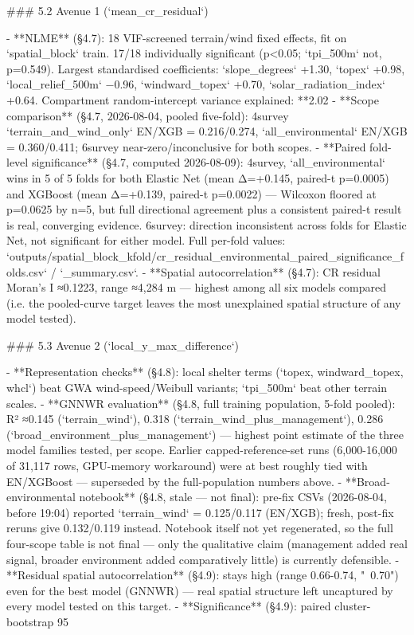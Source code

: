 ### 5.2 Avenue 1 (`mean_cr_residual`)

- **NLME** (§4.7): 18 VIF-screened terrain/wind fixed effects, fit on `spatial_block` train. 17/18 individually significant (p<0.05; `tpi_500m` not, p=0.549). Largest standardised coefficients: `slope_degrees` +1.30, `topex` +0.98, `local_relief_500m` −0.96, `windward_topex` +0.70, `solar_radiation_index` +0.64. Compartment random-intercept variance explained: **2.02%
- **Scope comparison** (§4.7, 2026-08-04, pooled five-fold): 4survey `terrain_and_wind_only` EN/XGB = 0.216/0.274, `all_environmental` EN/XGB = 0.360/0.411; 6survey near-zero/inconclusive for both scopes.
- **Paired fold-level significance** (§4.7, computed 2026-08-09): 4survey, `all_environmental` wins in 5 of 5 folds for both Elastic Net (mean Δ=+0.145, paired-t p=0.0005) and XGBoost (mean Δ=+0.139, paired-t p=0.0022) — Wilcoxon floored at p=0.0625 by n=5, but full directional agreement plus a consistent paired-t result is real, converging evidence. 6survey: direction inconsistent across folds for Elastic Net, not significant for either model. Full per-fold values: `outputs/spatial_block_kfold/cr_residual_environmental_paired_significance_folds.csv` / `_summary.csv`.
- **Spatial autocorrelation** (§4.7): CR residual Moran's I ≈0.1223, range ≈4,284 m — highest among all six models compared (i.e. the pooled-curve target leaves the most unexplained spatial structure of any model tested).

### 5.3 Avenue 2 (`local_y_max_difference`)

- **Representation checks** (§4.8): local shelter terms (`topex, windward_topex, whcl`) beat GWA wind-speed/Weibull variants; `tpi_500m` beat other terrain scales.
- **GNNWR evaluation** (§4.8, full training population, 5-fold pooled): R² ≈0.145 (`terrain_wind`), 0.318 (`terrain_wind_plus_management`), 0.286 (`broad_environment_plus_management`) — highest point estimate of the three model families tested, per scope. Earlier capped-reference-set runs (6,000-16,000 of 31,117 rows, GPU-memory workaround) were at best roughly tied with EN/XGBoost — superseded by the full-population numbers above.
- **Broad-environmental notebook** (§4.8, stale — not final): pre-fix CSVs (2026-08-04, before 19:04) reported `terrain_wind` = 0.125/0.117 (EN/XGB); fresh, post-fix reruns give 0.132/0.119 instead. Notebook itself not yet regenerated, so the full four-scope table is not final — only the qualitative claim (management added real signal, broader environment added comparatively little) is currently defensible.
- **Residual spatial autocorrelation** (§4.9): stays high (range 0.66-0.74, "~0.70") even for the best model (GNNWR) — real spatial structure left uncaptured by every model tested on this target.
- **Significance** (§4.9): paired cluster-bootstrap 95%

